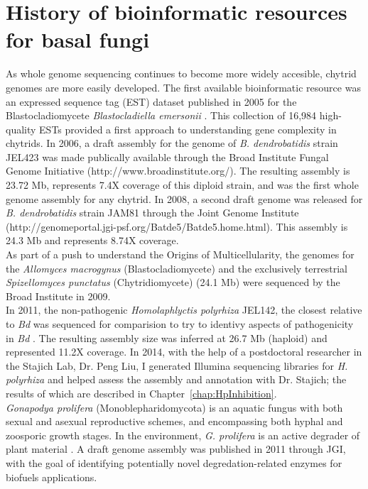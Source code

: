 \section{History of bioinformatic resources for basal fungi}
As whole genome sequencing continues to become more widely accesible, chytrid genomes are more easily developed. The first available bioinformatic resource was an expressed sequence tag (EST) dataset published in 2005 for the Blastocladiomycete \textit{Blastocladiella emersonii} \cite{Ribichich2005}. This collection of 16,984 high-quality ESTs provided a first approach to understanding gene complexity in chytrids. In 2006, a draft assembly for the genome of \textit{B. dendrobatidis} strain JEL423 was made publically available through the Broad Institute Fungal Genome Initiative (http://www.broadinstitute.org/). The resulting assembly is 23.72 Mb, represents 7.4X coverage of this diploid strain, and was the first whole genome assembly for any chytrid. In 2008, a second draft genome was released for \textit{B. dendrobatidis} strain JAM81 through the Joint Genome Institute (http://genomeportal.jgi-psf.org/Batde5/Batde5.home.html). This assembly is 24.3 Mb and represents 8.74X coverage. \\
\indent As part of a push to understand the Origins of Multicellularity, the genomes for the \textit{Allomyces macrogynus} (Blastocladiomycete) and the exclusively terrestrial \textit{Spizellomyces punctatus} (Chytridiomycete) (24.1 Mb) were sequenced by the Broad Institute in 2009. \\
\indent In 2011, the non-pathogenic \textit{Homolaphlyctis polyrhiza} JEL142, the closest relative to \textit{Bd} was sequenced for comparision to try to identivy aspects of pathogenicity in \textit{Bd} \cite{Joneson2011}. The resulting assembly size was inferred at 26.7 Mb (haploid) and represented 11.2X coverage. In 2014, with the help of a postdoctoral researcher in the Stajich Lab, Dr. Peng Liu, I generated Illumina sequencing libraries for \textit{H. polyrhiza} and helped assess the assembly and annotation with Dr. Stajich; the results of which are described in Chapter~\ref{chap:HpInhibition}.\\
\indent \textit{Gonapodya prolifera} (Monoblepharidomycota) is an aquatic fungus with both sexual and asexual reproductive schemes, and encompassing both hyphal and zoosporic growth stages. In the environment, \textit{G. prolifera} is an active degrader of plant material \cite{Karling1977}. A draft genome assembly was published in 2011 through JGI, with the goal of identifying potentially novel degredation-related enzymes for biofuels applications.\\
